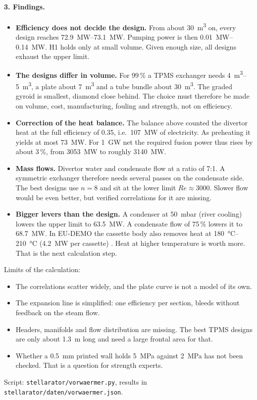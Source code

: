 \documentclass[10pt,a4paper]{article}
\begin{document}
\paragraph{3. Findings.}
\begin{itemize}
\item \textbf{Efficiency does not decide the design.} From about \SI{30}{m^3} on, every design reaches
  \SIrange{72.9}{73.1}{MW}. Pumping power is then \SIrange{0.01}{0.14}{MW}. H1 holds only at small volume. Given
  enough size, all designs exhaust the upper limit.
\item \textbf{The designs differ in volume.} For 99\,\% a TPMS exchanger needs \SIrange{4}{5}{m^3}, a plate about
  \SI{7}{m^3} and a tube bundle about \SI{30}{m^3}. The graded gyroid is smallest, diamond close behind. The choice
  must therefore be made on volume, cost, manufacturing, fouling and strength, not on efficiency.
\item \textbf{Correction of the heat balance.} The balance above counted the divertor heat at the full efficiency
  of 0.35, i.e.\ \SI{107}{MW} of electricity. As preheating it yields at most \SI{73}{MW}. For \SI{1}{GW} net the
  required fusion power thus rises by about 3\,\%, from \SI{3053}{MW} to roughly \SI{3140}{MW}.
\item \textbf{Mass flows.} Divertor water and condensate flow at a ratio of 7:1. A symmetric exchanger therefore
  needs several passes on the condensate side. The best designs use $n = 8$ and sit at the lower limit
  $\mathit{Re} \approx 3000$. Slower flow would be even better, but verified correlations for it are missing.
\item \textbf{Bigger levers than the design.} A condenser at \SI{50}{mbar} (river cooling) lowers the upper limit to
  \SI{63.5}{MW}. A condensate flow of 75\,\% lowers it to \SI{68.7}{MW}. In EU-DEMO the cassette body also removes
  heat at \SIrange{180}{210}{\celsius} (\SI{4.2}{MW} per cassette) \cite{you2022}. Heat at higher temperature is
  worth more. That is the next calculation step.
\end{itemize}
Limits of the calculation:
\begin{itemize}
\item The correlations scatter widely, and the plate curve is not a model of its own.
\item The expansion line is simplified: one efficiency per section, bleeds without feedback on the steam flow.
\item Headers, manifolds and flow distribution are missing. The best TPMS designs are only about \SI{1.3}{m} long
  and need a large frontal area for that.
\item Whether a \SI{0.5}{mm} printed wall holds \SI{5}{MPa} against \SI{2}{MPa} has not been checked. That is a
  question for strength experts.
\end{itemize}
Script: \texttt{stellarator/vorwaermer.py}, results in \texttt{stellarator/daten/vorwaermer.json}.
\end{document}
